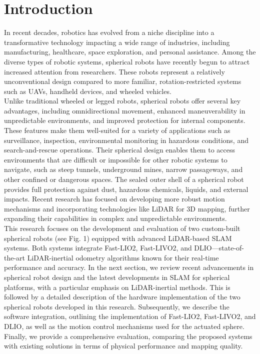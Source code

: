 \documentclass[conference]{IEEEtran}
\begin{document}
\section{Introduction}
In recent decades, robotics has evolved from a niche discipline into a transformative technology impacting a wide range of industries, including manufacturing, healthcare, space exploration, and personal assistance. Among the diverse types of robotic systems, spherical robots have recently begun to attract increased attention from researchers. These robots represent a relatively unconventional design compared to more familiar, rotation-restricted systems such as UAVs, handheld devices, and wheeled vehicles. \\
\hspace*{1em}Unlike traditional wheeled or legged robots, spherical robots offer several key advantages, including omnidirectional movement, enhanced maneuverability in unpredictable environments, and improved protection for internal components. These features make them well-suited for a variety of applications such as surveillance, inspection, environmental monitoring in hazardous conditions, and search-and-rescue operations. Their spherical design enables them to access environments that are difficult or impossible for other robotic systems to navigate, such as steep tunnels, underground mines, narrow passageways, and other confined or dangerous spaces.
The sealed outer shell of a spherical robot provides full protection against dust, hazardous chemicals, liquids, and external impacts. Recent research has focused on developing more robust motion mechanisms \cite{roboball,novelsphere,pendulum_sphere} and incorporating technologies like LiDAR for 3D mapping, further expanding their capabilities in complex and unpredictable environments\cite{Kalman_filter_sphere,DAEDALUS,sphere_Fabi_1}.\\
\hspace*{1em}This research focuses on the development and evaluation of two custom-built spherical robots (see Fig. 1) equipped with advanced LiDAR-based SLAM systems. Both systems integrate Fast-LIO2\cite{fastlio2}, Fast-LIVO2\cite{fastlivo2}, and DLIO\cite{dlio}—state-of-the-art LiDAR-inertial odometry algorithms known for their real-time performance and accuracy.
In the next section, we review recent advancements in spherical robot design and the latest developments in SLAM for spherical platforms, with a particular emphasis on LiDAR-inertial methods. This is followed by a detailed description of the hardware implementation of the two spherical robots developed in this research. Subsequently, we describe the software integration, outlining the implementation of Fast-LIO2, Fast-LIVO2, and DLIO, as well as the motion control mechanisms used for the actuated sphere. Finally, we provide a comprehensive evaluation, comparing the proposed systems with existing solutions in terms of physical performance and mapping quality.
\end{document}
